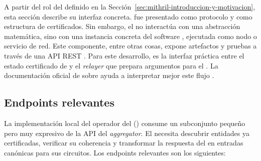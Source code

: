 
A partir del rol del \MithrilAggregator definido en la Sección~\ref{sec:mithril-introduccion-y-motivacion}, esta sección describe su interfaz concreta. \Mithril fue presentado como protocolo y como estructura de certificados. Sin embargo, el \zkBridge no interactúa con una abstracción matemática, sino con una instancia concreta del software \MithrilAggregator, ejecutada como nodo o servicio de red. Este componente, entre otras cosas, expone artefactos y pruebas a través de una API \textsc{REST} \cite{MithrilDocsAggregator}. Para este desarrollo, es la interfaz práctica entre el estado certificado de \Cardano y el \textit{relayer} \Offchain que prepara argumentos para el \zkBridge. La documentación oficial de \Mithril sobre \CardanoTransactions ayuda a interpretar mejor este flujo \cite{MithrilDocsTransactions}.

\subsection{Endpoints relevantes}
\label{subsec:aggregator-api-e-integracion-endpoints-relevantes}

La implementación local del operador del \zkBridge (\ZkBridgeOperator) consume un subconjunto pequeño pero muy expresivo de la API del \textit{aggregator}. El \ZkBridgeOperator necesita descubrir entidades ya certificadas, verificar su coherencia y transformar la respuesta del \MithrilAggregator en entradas canónicas para sus circuitos. Los endpoints relevantes son los siguientes:

